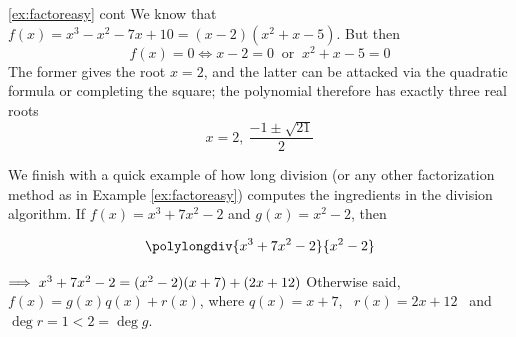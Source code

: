 

\begin{example*}{\ref{ex:factoreasy} cont}{}
	We know that $f(x)=x^3-x^2-7x+10=(x-2)(x^2+x-5)$. But then
	\[
		f(x)=0\iff x-2=0\ \text{ or }\ x^2+x-5=0
	\]
	The former gives the root $x=2$, and the latter can be attacked via the quadratic formula or completing the square; the polynomial therefore has exactly three real roots
	\[
		x=2,\ \frac{-1\pm\sqrt{21}}2
	\] 
\end{example*}


\begin{example}{}{}
	We finish with a quick example of how long division (or any other factorization method as in Example \ref{ex:factoreasy}) computes the ingredients in the division algorithm.\smallbreak
	If $f(x)=x^3+7x^2-2$ and $g(x)=x^2-2$, then\par
	\begin{minipage}[t]{0.35\linewidth}\vspace{-13pt}
		\[
			\polylongdiv{x^3+7x^2-2}{x^2-2}
		\]
	\end{minipage}
	\hfill
	\begin{minipage}[t]{0.6\linewidth}\vspace{10pt}
		$\negthickspace\implies x^3+7x^2-2=(x^2-2)(x+7)+(2x+12)$\medbreak
		Otherwise said, $f(x)=g(x)q(x)+r(x)$, where\medbreak
		$q(x)=x+7$, \ $r(x)=2x+12$ \ and \ $\deg r=1<2=\deg g$.
	\end{minipage}
\end{example}

\goodbreak



